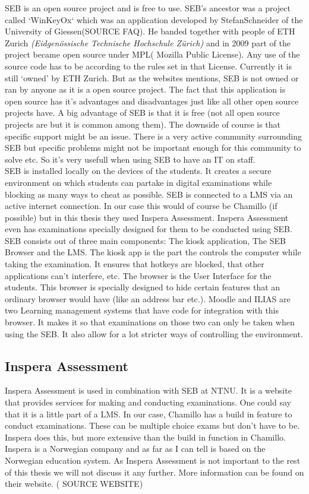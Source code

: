 SEB is an open source project and is free to use. SEB's ancestor was a project called `WinKeyOx` which was an application developed by StefanSchneider of the University of Giessen(SOURCE FAQ). He banded together with people of ETH Zurich \textit{(Eidgenössische Technische Hochschule Zürich)} and in 2009 part of the project became open source under MPL( Mozilla Public License). Any use of the source code has to be according to the rules set in that License. Currently it is still `owned' by ETH Zurich. But as the websites mentions, SEB is not owned or ran by anyone as it is a open source project.
The fact that this application is open source has it's advantages and disadvantages just like all other open source projects have. A big advantage of SEB is that it is free (not all open source projects are but it is common among them). The downside of course is that specific support might be an issue. There is a very active community surrounding SEB but specific problems might not be important enough for this community to solve etc. So it's very usefull when using SEB to have an IT on staff.\\

SEB is installed locally on the devices of the students. It creates a secure environment on which students can partake in digital examinations while blocking as many ways to cheat as possible. SEB is connected to a LMS via an active internet connection. In our case this would of course be Chamillo (if possible) but in this thesis they used Inspera Assessment. Inspera Assessment even has examinations specially designed for them to be conducted using SEB.
SEB consists out of three main components: The kiosk application, The SEB Browser and the LMS. The kiosk app is the part the controls the computer while taking the examination. It ensures that hotkeys are blocked, that other applications can't interfere, etc. 
The browser is the User Interface for the students. This browser is specially designed to hide certain features that an ordinary browser would have (like an address bar etc.). Moodle and ILIAS are two Learning management systems that have code for integration with this browser. It makes it so that examinations on those two can only be taken when using the SEB. It also allow for a lot stricter ways of controlling the environment. \\

\subsection{Inspera Assessment}
Inspera Assessment is used in combination with SEB at NTNU. It is a website that provides services for making and conducting examinations. One could say that it is a little part of a LMS. In our case, Chamillo has a build in feature to conduct examinations. These can be multiple choice exams but don't have to be.  Inspera does this, but more extensive than the build in function in Chamillo. Inspera is a Norwegian company and as far as I can tell is based on the Norwegian education system. As Inspera Assessment is not important to the rest of this thesis we will not discuss it any further. More information can be found on their website. ( SOURCE WEBSITE) 

